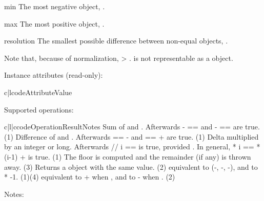 \begin{memberdesc}{min}
  The most negative  object,
  .
\end{memberdesc}

\begin{memberdesc}{max}
  The most positive  object,
  .
\end{memberdesc}

\begin{memberdesc}{resolution}
  The smallest possible difference between non-equal
   objects, .
\end{memberdesc}

Note that, because of normalization,  \textgreater
{}.   is not representable as
a  object.

Instance attributes (read-only):

\begin{tableii}{c|l}{code}{Attribute}{Value}
\end{tableii}

Supported operations:

\begin{tableiii}{c|l|c}{code}{Operation}{Result}{Notes}
          {Sum of  and .
           Afterwards - ==  and -
           ==  are true.}
          {(1)}
          {Difference of  and . Afterwards  ==
            -  and  ==  +  are
           true.}
          {(1)}
          {Delta multiplied by an integer or long.
           Afterwards  // i ==  is true,
           provided .
           In general,  * i ==  * (i-1) +  is true.}
          {(1)}
          {The floor is computed and the remainder (if any) is thrown away.}
          {(3)}
          {Returns a  object with the same value.}
          {(2)}
          {equivalent to (-, -,
           -), and to * -1.}
          {(1)(4)}
          {equivalent to + when , and to
           - when .}
          {(2)}
\end{tableiii}
\noindent
Notes:


